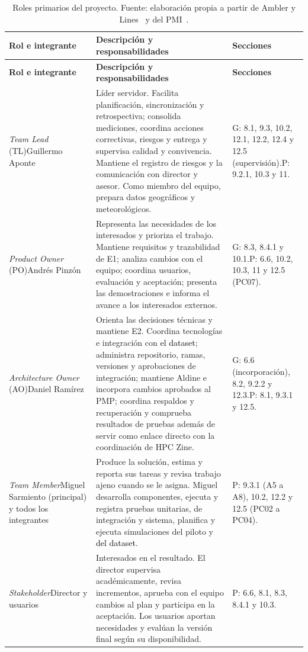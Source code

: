 \begin{longtable}{|p{}|p{}|p{}|}
\caption{Roles primarios del proyecto. Fuente: elaboración propia a partir de Ambler y Lines~\cite{ambler2012dad} y del PMI~\cite{pmiDADroles}.}\label{tab:roles}\\\hline
\textbf{Rol e integrante} & \textbf{Descripción y responsabilidades} & \textbf{Secciones}\tabularnewline\hline
\endfirsthead
\hline
\textbf{Rol e integrante} & \textbf{Descripción y responsabilidades} & \textbf{Secciones}\tabularnewline\hline
\endhead
\raggedright \textit{Team Lead} (TL)\newline Guillermo Aponte & \raggedright Líder servidor. Facilita planificación, sincronización y retrospectiva; consolida mediciones, coordina acciones correctivas, riesgos y entrega y supervisa calidad y convivencia. Mantiene el registro de riesgos y la comunicación con director y asesor. Como miembro del equipo, prepara datos geográficos y meteorológicos. & \raggedright G: 8.1, 9.3, 10.2, 12.1, 12.2, 12.4 y 12.5 (supervisión).\newline P: 9.2.1, 10.3 y 11.\tabularnewline\hline
\raggedright \textit{Product Owner} (PO)\newline Andrés Pinzón & \raggedright Representa las necesidades de los interesados y prioriza el trabajo. Mantiene requisitos y trazabilidad de E1; analiza cambios con el equipo; coordina usuarios, evaluación y aceptación; presenta las demostraciones e informa el avance a los interesados externos. & \raggedright G: 8.3, 8.4.1 y 10.1.\newline P: 6.6, 10.2, 10.3, 11 y 12.5 (PC07).\tabularnewline\hline
\raggedright \textit{Architecture Owner} (AO)\newline Daniel Ramírez & \raggedright Orienta las decisiones técnicas y mantiene E2. Coordina tecnologías e integración con \textcolor{black}{el dataset}; administra repositorio, ramas, versiones y aprobaciones de integración; mantiene Aldine e incorpora cambios aprobados al PMP; coordina respaldos y recuperación y comprueba resultados de pruebas además de servir como enlace directo con la coordinación de HPC Zine. & \raggedright G: 6.6 (incorporación), 8.2, 9.2.2 y 12.3.\newline P: 8.1, 9.3.1 y 12.5.\tabularnewline\hline
\raggedright \textit{Team Member}\newline Miguel Sarmiento (principal) y todos los integrantes & \raggedright Produce la solución, estima y reporta sus tareas y revisa trabajo ajeno cuando se le asigna. Miguel desarrolla componentes, ejecuta y registra pruebas unitarias, de integración y sistema, planifica y ejecuta simulaciones del piloto y \textcolor{black}{del dataset}. & \raggedright P: 9.3.1 (A5 a A8), 10.2, 12.2 y 12.5 (PC02 a PC04).\tabularnewline\hline
\raggedright \textit{Stakeholder}\newline Director y usuarios & \raggedright Interesados en el resultado. El director supervisa académicamente, revisa incrementos, aprueba con el equipo cambios al plan y participa en la aceptación. Los usuarios aportan necesidades y evalúan la versión final según su disponibilidad. & \raggedright P: 6.6, 8.1, 8.3, 8.4.1 y 10.3.\tabularnewline\hline
\end{longtable}

